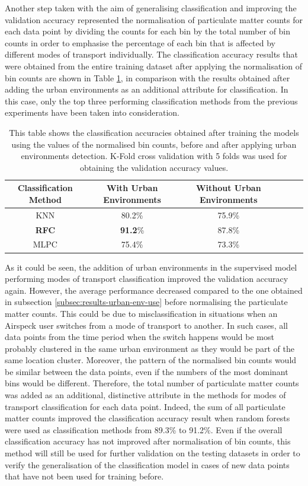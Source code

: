 \documentclass[bsc,frontabs,twoside,singlespacing, parskip,deptreport]{infthesis}     %
\begin{document}
Another step taken with the aim of generalising classification and improving the validation accuracy represented the normalisation of particulate matter counts for each data point by dividing the counts for each bin by the total number of bin counts in order to emphasise the percentage of each bin that is affected by different modes of transport individually. The classification accuracy results that were obtained from the entire training dataset after applying the normalisation of bin counts are shown in Table \ref{table:norm-bin-counts}, in comparison with the results obtained after adding the urban environments as an additional attribute for classification. In this case, only the top three performing classification methods from the previous experiments have been taken into consideration.


\begin{table}[h!]
\centering
 \begin{tabular}{||c | c | c | c | c | c||} 
 \hline
 Classification Method & With Urban Environments & Without Urban Environments \\ [0.5ex] 
 \hline\hline
 KNN & 80.2\% & 75.9\% \\
 \hline
 \textbf{RFC} & \textbf{91.2}\% & 87.8\% \\ 
 \hline
  MLPC & 75.4\% & 73.3\% \\ 
 \hline
\end{tabular}
\caption{This table shows the classification accuracies obtained after training the models using the values of the normalised bin counts, before and after applying urban environments detection. K-Fold cross validation with 5 folds was used for obtaining the validation accuracy values.}
\label{table:norm-bin-counts}
\end{table}

As it could be seen, the addition of urban environments in the supervised model performing modes of transport classification improved the validation accuracy again. However, the average performance decreased compared to the one obtained  in subsection \ref{subsec:results-urban-env-use} before normalising the particulate matter counts. This could be due to misclassification in situations when an Airspeck user switches from a mode of transport to another. In such cases, all data points from the time period when the switch happens would be most probably clustered in the same urban environment as they would be part of the same location cluster. Moreover, the pattern of the normalised bin counts would be similar between the data points, even if the numbers of the most dominant bins would be different. Therefore, the total number of particulate matter counts was added as an additional, distinctive attribute in the methods for modes of transport classification for each data point. Indeed, the sum of all particulate matter counts improved the classification accuracy result when random forests were used as classification methods from 89.3\% to 91.2\%. Even if the overall classification accuracy has not improved after normalisation of bin counts, this method will still be used for further validation on the testing datasets in order to verify the generalisation of the classification model in cases of new data points that have not been used for training before. 
\end{document}
